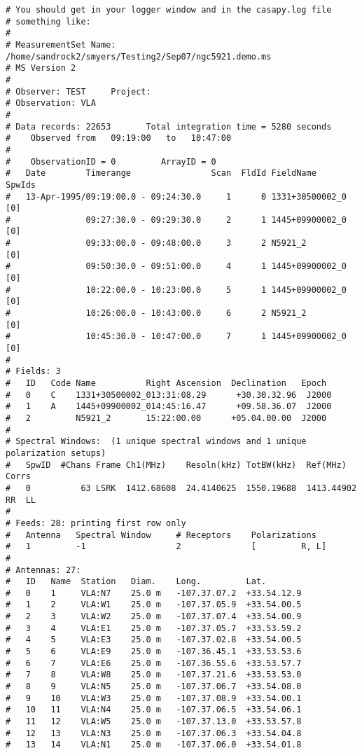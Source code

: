 \begin{verbatim}
# You should get in your logger window and in the casapy.log file
# something like:
#
# MeasurementSet Name:  /home/sandrock2/smyers/Testing2/Sep07/ngc5921.demo.ms
# MS Version 2
# 
# Observer: TEST     Project:   
# Observation: VLA
# 
# Data records: 22653       Total integration time = 5280 seconds
#    Observed from   09:19:00   to   10:47:00
# 
#    ObservationID = 0         ArrayID = 0
#   Date        Timerange                Scan  FldId FieldName      SpwIds
#   13-Apr-1995/09:19:00.0 - 09:24:30.0     1      0 1331+30500002_0  [0]
#               09:27:30.0 - 09:29:30.0     2      1 1445+09900002_0  [0]
#               09:33:00.0 - 09:48:00.0     3      2 N5921_2        [0]
#               09:50:30.0 - 09:51:00.0     4      1 1445+09900002_0  [0]
#               10:22:00.0 - 10:23:00.0     5      1 1445+09900002_0  [0]
#               10:26:00.0 - 10:43:00.0     6      2 N5921_2        [0]
#               10:45:30.0 - 10:47:00.0     7      1 1445+09900002_0  [0]
# 
# Fields: 3
#   ID   Code Name          Right Ascension  Declination   Epoch   
#   0    C    1331+30500002_013:31:08.29      +30.30.32.96  J2000   
#   1    A    1445+09900002_014:45:16.47      +09.58.36.07  J2000   
#   2         N5921_2       15:22:00.00      +05.04.00.00  J2000   
# 
# Spectral Windows:  (1 unique spectral windows and 1 unique polarization setups)
#   SpwID  #Chans Frame Ch1(MHz)    Resoln(kHz) TotBW(kHz)  Ref(MHz)    Corrs   
#   0          63 LSRK  1412.68608  24.4140625  1550.19688  1413.44902  RR  LL  
# 
# Feeds: 28: printing first row only
#   Antenna   Spectral Window     # Receptors    Polarizations
#   1         -1                  2              [         R, L]
# 
# Antennas: 27:
#   ID   Name  Station   Diam.    Long.         Lat.         
#   0    1     VLA:N7    25.0 m   -107.37.07.2  +33.54.12.9  
#   1    2     VLA:W1    25.0 m   -107.37.05.9  +33.54.00.5  
#   2    3     VLA:W2    25.0 m   -107.37.07.4  +33.54.00.9  
#   3    4     VLA:E1    25.0 m   -107.37.05.7  +33.53.59.2  
#   4    5     VLA:E3    25.0 m   -107.37.02.8  +33.54.00.5  
#   5    6     VLA:E9    25.0 m   -107.36.45.1  +33.53.53.6  
#   6    7     VLA:E6    25.0 m   -107.36.55.6  +33.53.57.7  
#   7    8     VLA:W8    25.0 m   -107.37.21.6  +33.53.53.0  
#   8    9     VLA:N5    25.0 m   -107.37.06.7  +33.54.08.0  
#   9    10    VLA:W3    25.0 m   -107.37.08.9  +33.54.00.1  
#   10   11    VLA:N4    25.0 m   -107.37.06.5  +33.54.06.1  
#   11   12    VLA:W5    25.0 m   -107.37.13.0  +33.53.57.8  
#   12   13    VLA:N3    25.0 m   -107.37.06.3  +33.54.04.8  
#   13   14    VLA:N1    25.0 m   -107.37.06.0  +33.54.01.8  

\end{verbatim}
